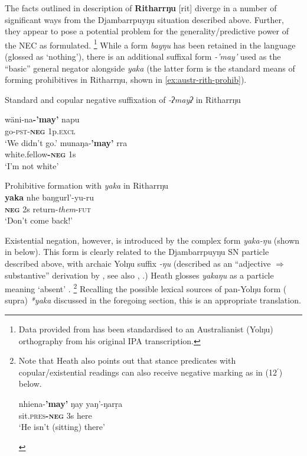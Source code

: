 \documentclass[output=paper]{langsci/langscibook}
\begin{document}
The facts outlined in  description of {\bf
Ritharrŋu} [rit] diverge in a number of significant ways
from the Djambarrpuyŋu situation described above. Further, they appear to
pose a potential problem for the generality\slash predictive power of the
NEC as formulated.%
%
\footnote{Data provided from \citet{Heath1980} has been standardised to an Australianist (Yolŋu) orthography from his original IPA transcription.} 
%
While a form \textit{bayŋu} has been retained in the language (glossed as `nothing'), there is an additional suffixal form \textit{-'may'} used as the ``basic'' \citep[101]{Heath1980} general negator alongside \textit{yaka} (the latter form is the standard means of forming prohibitives in Ritharrŋu, shown in \ref{ex:austr-rith-prohib}).
%
\begin{exe}\ex Standard and copular negative suffixation of {\em -ʔmayʔ} in Ritharrŋu
    \begin{xlist}
    \ex\label{ex:austr-rith-negsuffix-go}
    \gll wäni-na\textbf{-'may'} napu\\
go-\textsc{pst-\textbf{neg}} 1p\textsc{.excl}\\
\glt  `We didn't go.'
\ex\gll munaŋa-\textbf{'may'} rra\\
white.fellow\textsc{\textbf{-neg}} 1s\\
\glt `I'm not white' \hfill {\citep[101]{Heath1980}}\end{xlist}
%
\ex \label{ex:austr-rith-prohib} Prohibitive formation with {\em yaka} in Ritharrŋu\\
\gll \textbf{yaka} nhe baŋgurl'-yu-ru\\
\textsc{\textbf{neg}} 2s return-\textit{them}-\textsc{fut}\\
\glt `Don't come back!' \hfill {\citep[76]{Heath1980}}\\\end{exe}

Existential negation, however, is introduced by the complex form
\textit{yaka-ŋu} (shown in  below). This
form is clearly related to the Djambarrpuyŋu SN particle
described above, with archaic Yolŋu suffix {\textit{-ŋu}} (described as an
``adjective $\Rightarrow$ substantive'' derivation by
\citealt[34]{Schebeck2001}, see also \citealt[174ff]{Wilkinson1991},
\citealt[24]{Heath1980}.) Heath glosses \textit{yakaŋu} as a particle
meaning `absent' \citeyearpar[102]{Heath1980}.%
%
\footnote{Note that Heath also points out that stance predicates with
copular\slash existential readings can also receive negative marking as in
(12$^\prime$) below. 
    \begin{exe}\label{ex:austr-exist-neg-rith-fn}
        \gll nhiena-\textbf{'may'} ŋay yaŋ'-ŋarṛa\\
	sit\textsc{.pres\textbf{-neg}} 3s here\\
	\glt `He isn't (sitting) there' \hfill {\citep[102]{Heath1980}} \end{exe}
}
Recalling the possible lexical sources of pan-Yolŋu form ( supra) \textit{*yaka} discussed in the foregoing section, this is an appropriate translation.
\end{document}
